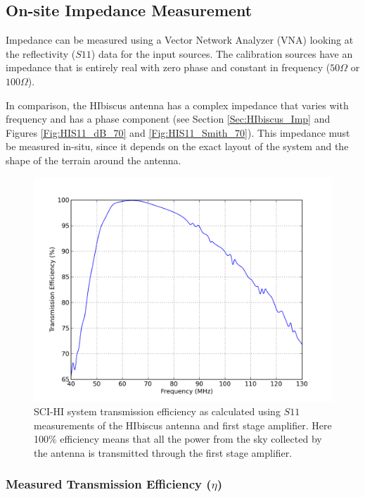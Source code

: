 \subsection{On-site Impedance Measurement}

Impedance can be measured using a Vector Network Analyzer (VNA) looking at the reflectivity ($S11$) data for the input sources. The calibration sources have an impedance that is entirely real with zero phase and constant in frequency ($50 \Omega$ or $100 \Omega$).

In comparison, the HIbiscus antenna has a complex impedance that varies with frequency and has a phase component (see Section \ref{Sec:HIbiscus_Imp} and Figures \ref{Fig:HIS11_dB_70} and \ref{Fig:HIS11_Smith_70}). This impedance must be measured in-situ, since it depends on the exact layout of the system and the shape of the terrain around the antenna. 

\begin{figure}[htb]
\begin{center}
\includegraphics[width=0.9\linewidth]{Data_analysis/figures/old_ant_efficiency.png}
\caption{SCI-HI system transmission efficiency as calculated using $S11$ measurements of the HIbiscus antenna and first stage amplifier. Here 100\% efficiency means that all the power from the sky collected by the antenna is transmitted through the first stage amplifier. }
\label{Fig:eff}
\end{center}
\end{figure}

\subsubsection{Measured Transmission Efficiency ($\eta$)}

